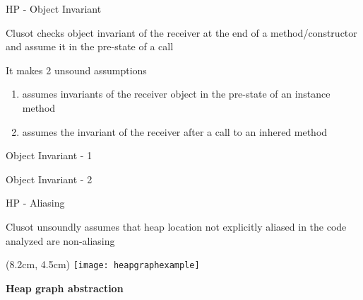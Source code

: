
\begin{frame}{HP - Object Invariant}

\vspace*{-0.4cm}

Clusot checks object invariant of the receiver at the end of a
method/constructor and assume it in the pre-state of a call

\vfill

It makes 2 unsound assumptions
\begin{enumerate}
\item assumes invariants of the receiver object in the pre-state of an
instance method
\item assumes the invariant of the receiver after a call to an
inhered method
\end{enumerate}

\end{frame}


\begin{frame}[fragile]{Object Invariant - 1}
\vspace*{-0.4cm}
\only<1>{}
\end{frame}


\begin{frame}[fragile]{Object Invariant - 2}
\vspace*{-0.4cm}
\only<1>{}
\end{frame}


\begin{frame}{HP - Aliasing}

\vspace*{-0.4cm}

Clusot unsoundly assumes that heap location not explicitly aliased in the code
analyzed are non-aliasing

\vfill

\begin{textblock*}{1cm}(8.2cm, 4.5cm)
    \texttt{[image: heapgraphexample]}
\end{textblock*}

\textbf{Heap graph abstraction}


\end{frame}

